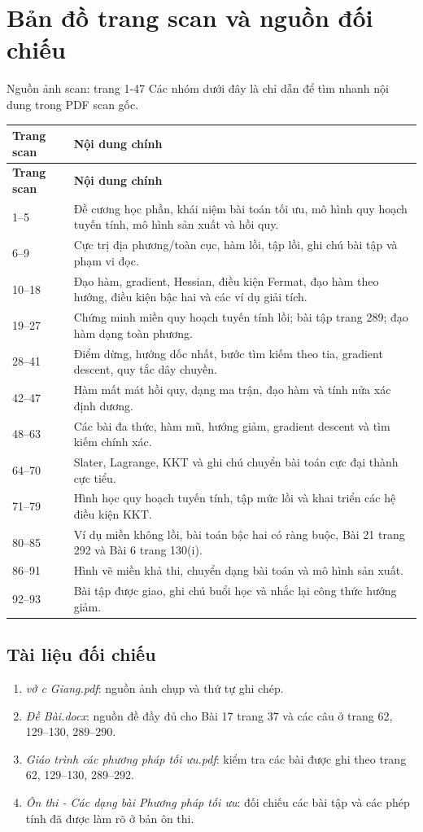 \documentclass[11pt,a4paper]{article}
\newcommand{\src}[1]{\hfill{\footnotesize\color{gray}Nguồn ảnh scan: trang #1}}
\begin{document}
\section{Bản đồ trang scan và nguồn đối chiếu}
\src{1-47}
Các nhóm dưới đây là chỉ dẫn để tìm nhanh nội dung trong PDF scan gốc.
\begin{longtable}{p{}p{}}
\toprule
\textbf{Trang scan} & \textbf{Nội dung chính}\\
\midrule
\endfirsthead
\toprule
\textbf{Trang scan} & \textbf{Nội dung chính}\\
\midrule
\endhead
1--5 & Đề cương học phần, khái niệm bài toán tối ưu, mô hình quy hoạch tuyến tính, mô hình sản xuất và hồi quy.\\
6--9 & Cực trị địa phương/toàn cục, hàm lồi, tập lồi, ghi chú bài tập và phạm vi đọc.\\
10--18 & Đạo hàm, gradient, Hessian, điều kiện Fermat, đạo hàm theo hướng, điều kiện bậc hai và các ví dụ giải tích.\\
19--27 & Chứng minh miền quy hoạch tuyến tính lồi; bài tập trang 289; đạo hàm dạng toàn phương.\\
28--41 & Điểm dừng, hướng dốc nhất, bước tìm kiếm theo tia, gradient descent, quy tắc dây chuyền.\\
42--47 & Hàm mất mát hồi quy, dạng ma trận, đạo hàm và tính nửa xác định dương.\\
48--63 & Các bài đa thức, hàm mũ, hướng giảm, gradient descent và tìm kiếm chính xác.\\
64--70 & Slater, Lagrange, KKT và ghi chú chuyển bài toán cực đại thành cực tiểu.\\
71--79 & Hình học quy hoạch tuyến tính, tập mức lồi và khai triển các hệ điều kiện KKT.\\
80--85 & Ví dụ miền không lồi, bài toán bậc hai có ràng buộc, Bài 21 trang 292 và Bài 6 trang 130(i).\\
86--91 & Hình vẽ miền khả thi, chuyển dạng bài toán và mô hình sản xuất.\\
92--93 & Bài tập được giao, ghi chú buổi học và nhắc lại công thức hướng giảm.\\
\bottomrule
\end{longtable}

\subsection*{Tài liệu đối chiếu}
\begin{enumerate}
\item \textit{vở c Giang.pdf}: nguồn ảnh chụp và thứ tự ghi chép.
\item \textit{Đề Bài.docx}: nguồn đề đầy đủ cho Bài 17 trang 37 và các câu ở trang 62, 129--130, 289--290.
\item \textit{Giáo trình các phương pháp tối ưu.pdf}: kiểm tra các bài được ghi theo trang 62, 129--130, 289--292.
\item \textit{Ôn thi - Các dạng bài Phương pháp tối ưu}: đối chiếu các bài tập và các phép tính đã được làm rõ ở bản ôn thi.
\end{enumerate}
\end{document}
